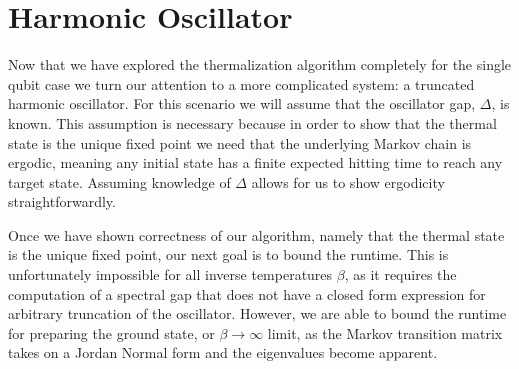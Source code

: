 \documentclass{article}
\begin{document}
\section{Harmonic Oscillator}
Now that we have explored the thermalization algorithm completely for the single qubit case we turn our attention to a more complicated system: a truncated harmonic oscillator. For this scenario we will assume that the oscillator gap, $\Delta$, is known. This assumption is necessary because in order to show that the thermal state is the unique fixed point we need that the underlying Markov chain is ergodic, meaning any initial state has a finite expected hitting time to reach any target state. Assuming knowledge of $\Delta$ allows for us to show ergodicity straightforwardly.

Once we have shown correctness of our algorithm, namely that the thermal state is the unique fixed point, our next goal is to bound the runtime. This is unfortunately impossible for all inverse temperatures $\beta$, as it requires the computation of a spectral gap that does not have a closed form expression for arbitrary truncation of the oscillator. However, we are able to bound the runtime for preparing the ground state, or $\beta \to \infty$ limit, as the Markov transition matrix takes on a Jordan Normal form and the eigenvalues become apparent.  
\end{document}
